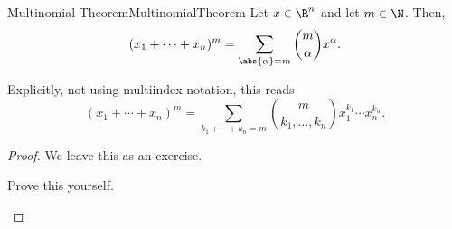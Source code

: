 \begin{thm}{Multinomial Theorem}{MultinomialTheorem}
Let $x\in \R ^n$ and let $m\in \N$.  Then,
\begin{equation}
(x_1+\cdots +x_n)^m=\sum _{\abs{\alpha}=m}\binom{m}{\alpha}x^{\alpha}.
\end{equation}
\begin{rmk}
Explicitly, not using multiindex notation, this reads
\begin{equation}
(x_1+\cdots +x_n)^m=\sum _{k_1+\cdots +k_n=m}\binom{m}{k_1,\ldots ,k_n}x_1^{k_1}\cdots x_n^{k_n}.
\end{equation}
\end{rmk}
\begin{proof}
We leave this as an exercise.
\begin{exr}[breakable=false]{}{}
Prove this yourself.
\end{exr}
\end{proof}
\end{thm}

